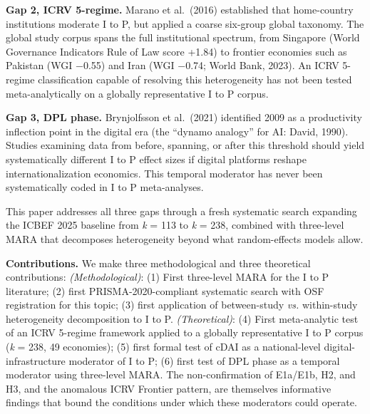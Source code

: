 \documentclass[
  12pt,a4paper]{article}
\begin{document}
\textbf{Gap 2, ICRV 5-regime.} Marano et al.~(2016) established that
home-country institutions moderate I to P, but applied a coarse
six-group global taxonomy. The global study corpus spans the full
institutional spectrum, from Singapore (World Governance Indicators Rule
of Law score +1.84) to frontier economies such as Pakistan (WGI −0.55)
and Iran (WGI −0.74; World Bank, 2023). An ICRV 5-regime classification
capable of resolving this heterogeneity has not been tested
meta-analytically on a globally representative I to P corpus.

\textbf{Gap 3, DPL phase.} Brynjolfsson et al.~(2021) identified 2009 as
a productivity inflection point in the digital era (the ``dynamo
analogy'' for AI: David, 1990). Studies examining data from before,
spanning, or after this threshold should yield systematically different
I to P effect sizes if digital platforms reshape internationalization
economics. This temporal moderator has never been systematically coded
in I to P meta-analyses.

This paper addresses all three gaps through a fresh systematic search
expanding the ICBEF 2025 baseline from \emph{k} = 113 to \emph{k} = 238,
combined with three-level MARA that decomposes heterogeneity beyond what
random-effects models allow.

\textbf{Contributions.} We make three methodological and three
theoretical contributions: \emph{(Methodological)}: (1) First
three-level MARA for the I to P literature; (2) first
PRISMA-2020-compliant systematic search with OSF registration for this
topic; (3) first application of between-study \emph{vs.} within-study
heterogeneity decomposition to I to P. \emph{(Theoretical)}: (4) First
meta-analytic test of an ICRV 5-regime framework applied to a globally
representative I to P corpus (\emph{k} = 238, 49 economies); (5) first
formal test of cDAI as a national-level digital-infrastructure moderator
of I to P; (6) first test of DPL phase as a temporal moderator using
three-level MARA. The non-confirmation of E1a/E1b, H2, and H3, and the
anomalous ICRV Frontier pattern, are themselves informative findings
that bound the conditions under which these moderators could operate.
\end{document}
